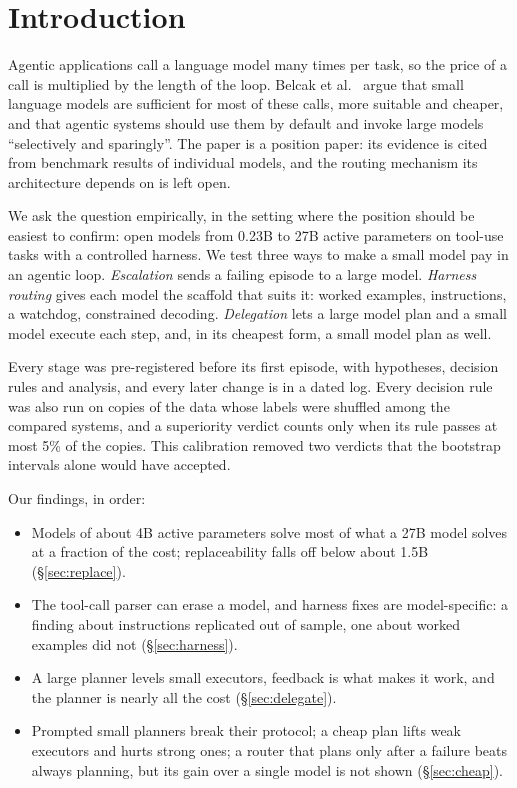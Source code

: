 \section{Introduction}

Agentic applications call a language model many times per task, so the price of a call is multiplied by the length
of the loop. Belcak et al.~\cite{belcak2025slm} argue that small language models are sufficient for most of these
calls, more suitable and cheaper, and that agentic systems should use them by default and invoke large models
``selectively and sparingly''. The paper is a position paper: its evidence is cited from benchmark results of
individual models, and the routing mechanism its architecture depends on is left open.

We ask the question empirically, in the setting where the position should be easiest to confirm: open models from
0.23B to 27B active parameters on tool-use tasks with a controlled harness. We test three ways to make a small model
pay in an agentic loop. \emph{Escalation} sends a failing episode to a large model. \emph{Harness routing} gives each
model the scaffold that suits it: worked examples, instructions, a watchdog, constrained decoding. \emph{Delegation}
lets a large model plan and a small model execute each step, and, in its cheapest form, a small model plan as well.

Every stage was pre-registered before its first episode, with hypotheses, decision rules and analysis, and every
later change is in a dated log. Every decision rule was also run on copies of the data whose labels were shuffled
among the compared systems, and a superiority verdict counts only when its rule passes at most 5\% of the copies.
This calibration removed two verdicts that the bootstrap intervals alone would have accepted.

Our findings, in order:
\begin{itemize}
  \item Models of about 4B active parameters solve most of what a 27B model solves at a fraction of the cost;
        replaceability falls off below about 1.5B (\S\ref{sec:replace}).
  \item The tool-call parser can erase a model, and harness fixes are model-specific: a finding about instructions
        replicated out of sample, one about worked examples did not (\S\ref{sec:harness}).
  \item A large planner levels small executors, feedback is what makes it work, and the planner is nearly all the
        cost (\S\ref{sec:delegate}).
  \item Prompted small planners break their protocol; a cheap plan lifts weak executors and hurts strong ones; a router
        that plans only after a failure beats always planning, but its gain over a single model is not shown
        (\S\ref{sec:cheap}).
\end{itemize}

